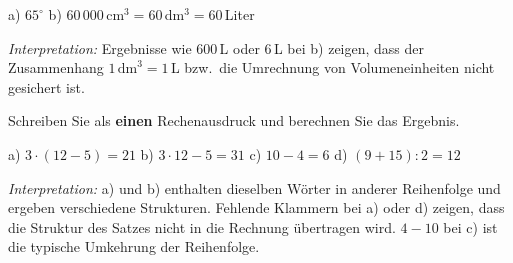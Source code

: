 \documentclass[11pt]{exam}
\newcommand{\aufgabe}[1]{%
  \needspace{8\baselineskip}%
  \renewcommand{\questionlabel}{\textbf{#1}}%
  \question}
\newcommand{\geteilt}{\mathbin{:}}
\newcommand{\raum}[1]{\ifprintanswers\else\fillwithgrid{#1}\fi}
\newcommand{\diagnose}[1]{\par\smallskip\textit{Interpretation:} #1}
\begin{document}
\begin{questions}
\aufgabe{8.4}
\begin{solution}
  a) $65^\circ$ \qquad b) $60\,000$\,cm$^3 = 60$\,dm$^3 = 60$\,Liter
  \diagnose{Ergebnisse wie $600$\,L oder $6$\,L bei b) zeigen, dass der
  Zusammenhang $1\,\text{dm}^3 = 1$\,L bzw.\ die Umrechnung von
  Volumeneinheiten nicht gesichert ist.}
\end{solution}
\raum{3cm}

\aufgabe{9.3}
Schreiben Sie als \textbf{einen} Rechenausdruck und berechnen Sie das Ergebnis.
\begin{solution}
  a) $3 \cdot (12 - 5) = 21$ \quad b) $3 \cdot 12 - 5 = 31$ \quad
  c) $10 - 4 = 6$ \quad d) $(9 + 15) \geteilt 2 = 12$
  \diagnose{a) und b) enthalten dieselben Wörter in anderer Reihenfolge und
  ergeben verschiedene Strukturen. Fehlende Klammern bei a) oder d) zeigen,
  dass die Struktur des Satzes nicht in die Rechnung übertragen wird. $4 - 10$
  bei c) ist die typische Umkehrung der Reihenfolge.}
\end{solution}
\raum{3.5cm}


\end{questions}
\end{document}
